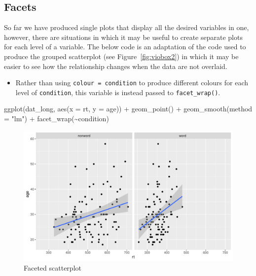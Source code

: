 \documentclass[
  english,
  doc,floatsintext]{apa6}
\newenvironment{Shaded}{\begin{snugshade}}{\end{snugshade}}
\newcommand{\AttributeTok}[1]{\textcolor[rgb]{0.77,0.63,0.00}{#1}}
\newcommand{\FunctionTok}[1]{\textcolor[rgb]{0.00,0.00,0.00}{#1}}
\newcommand{\NormalTok}[1]{#1}
\newcommand{\SpecialCharTok}[1]{\textcolor[rgb]{0.00,0.00,0.00}{#1}}
\newcommand{\StringTok}[1]{\textcolor[rgb]{0.31,0.60,0.02}{#1}}
\providecommand{\tightlist}{%
  \setlength{\itemsep}{0pt}\setlength{\parskip}{0pt}}
\begin{document}
\hypertarget{facets}{%
\subsection{Facets}\label{facets}}

So far we have produced single plots that display all the desired variables in one, however, there are situations in which it may be useful to create separate plots for each level of a variable. The below code is an adaptation of the code used to produce the grouped scatterplot (see Figure~\ref{fig:viobox2}) in which it may be easier to see how the relationship changes when the data are not overlaid.

\begin{itemize}
\tightlist
\item
  Rather than using \texttt{colour\ =\ condition} to produce different colours for each level of \texttt{condition}, this variable is instead passed to \texttt{facet\_wrap()}.
\end{itemize}

\begin{Shaded}
\begin{Highlighting}[]
\FunctionTok{ggplot}\NormalTok{(dat\_long, }\FunctionTok{aes}\NormalTok{(}\AttributeTok{x =}\NormalTok{ rt, }\AttributeTok{y =}\NormalTok{ age)) }\SpecialCharTok{+}
  \FunctionTok{geom\_point}\NormalTok{() }\SpecialCharTok{+}
  \FunctionTok{geom\_smooth}\NormalTok{(}\AttributeTok{method =} \StringTok{"lm"}\NormalTok{) }\SpecialCharTok{+}
  \FunctionTok{facet\_wrap}\NormalTok{(}\SpecialCharTok{\textasciitilde{}}\NormalTok{condition)}
\end{Highlighting}
\end{Shaded}

\begin{figure}

{\centering \includegraphics[width=1\linewidth]{images/scatterplot-facet-1} 

}

\caption{Faceted scatterplot}\label{fig:scatterplot-facet}
\end{figure}
\end{document}

